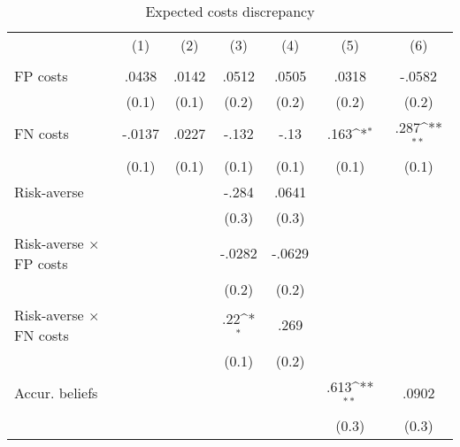 \begin{table}[htbp]\centering
\def\sym#1{\ifmmode^{#1}\else\(^{#1}\)\fi}
\caption{Expected costs discrepancy}
\begin{tabular}{l*{6}{c}}
\hline\hline
                &\multicolumn{1}{c}{(1)}&\multicolumn{1}{c}{(2)}&\multicolumn{1}{c}{(3)}&\multicolumn{1}{c}{(4)}&\multicolumn{1}{c}{(5)}&\multicolumn{1}{c}{(6)}\\
                &\multicolumn{1}{c}{}&\multicolumn{1}{c}{}&\multicolumn{1}{c}{}&\multicolumn{1}{c}{}&\multicolumn{1}{c}{}&\multicolumn{1}{c}{}\\
\hline
FP costs        &    .0438         &    .0142         &    .0512         &    .0505         &    .0318         &   -.0582         \\
                &    (0.1)         &    (0.1)         &    (0.2)         &    (0.2)         &    (0.2)         &    (0.2)         \\
FN costs        &   -.0137         &    .0227         &    -.132         &     -.13         &     .163\sym{*}  &     .287\sym{**} \\
                &    (0.1)         &    (0.1)         &    (0.1)         &    (0.1)         &    (0.1)         &    (0.1)         \\
Risk-averse     &                  &                  &    -.284         &    .0641         &                  &                  \\
                &                  &                  &    (0.3)         &    (0.3)         &                  &                  \\
Risk-averse $\times$ FP costs&                  &                  &   -.0282         &   -.0629         &                  &                  \\
                &                  &                  &    (0.2)         &    (0.2)         &                  &                  \\
Risk-averse $\times$ FN costs&                  &                  &      .22\sym{*}  &     .269         &                  &                  \\
                &                  &                  &    (0.1)         &    (0.2)         &                  &                  \\
Accur. beliefs  &                  &                  &                  &                  &     .613\sym{**} &    .0902         \\
                &                  &                  &                  &                  &    (0.3)         &    (0.3)         \\

\end{tabular}
\end{table}
